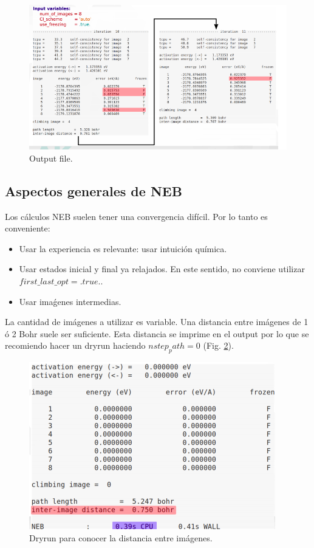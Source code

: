  \begin{figure}[H]
      \centering
      \includegraphics[scale = 0.5]{figs/D3/nebxout.png}
      \caption{Output file.}
      \label{fig:nebxout}
  \end{figure}

\subsection{Aspectos generales de NEB}

  Los cálculos NEB suelen tener una convergencia difícil. Por lo tanto es conveniente:
    \begin{itemize}
      \item Usar la experiencia es relevante: usar intuición química.
      \item Usar estados inicial y final ya relajados. En este sentido, no conviene utilizar $first\_last\_opt = .true.$.
      \item Usar imaǵenes intermedias.
    \end{itemize}

  La cantidad de imágenes a utilizar es variable. Una distancia entre imágenes de 1 ó 2 Bohr suele ser suficiente. Esta distancia se imprime en el output por lo que se recomiendo hacer un dryrun haciendo $nstep_path = 0$ (Fig. \ref{fig:dryrun}).

  \begin{figure}[H]
      \centering
      \includegraphics[scale = 0.7]{figs/D3/dryrun.png}
      \caption{Dryrun para conocer la distancia entre imágenes.}
      \label{fig:dryrun}
  \end{figure}

